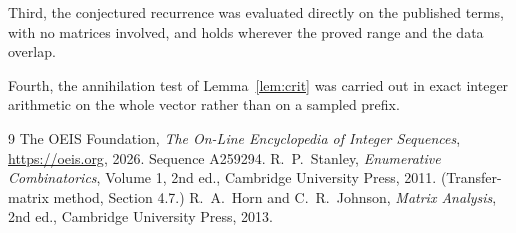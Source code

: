 \documentclass[11pt,a4paper]{article}
\theoremstyle{plain}
\theoremstyle{definition}
\begin{document}
Third, the conjectured recurrence was evaluated directly on the published terms, with no
matrices involved, and holds wherever the proved range and the data overlap.

Fourth, the annihilation test of Lemma~\ref{lem:crit} was carried out in exact integer
arithmetic on the whole vector rather than on a sampled prefix.

\begin{thebibliography}{9}
 The OEIS Foundation, \emph{The On-Line Encyclopedia of Integer
Sequences}, \url{https://oeis.org}, 2026. Sequence A259294.
 R.~P.~Stanley, \emph{Enumerative Combinatorics}, Volume 1, 2nd ed.,
Cambridge University Press, 2011. (Transfer-matrix method, Section 4.7.)
 R.~A.~Horn and C.~R.~Johnson, \emph{Matrix Analysis}, 2nd ed., Cambridge
University Press, 2013.
\end{thebibliography}
\end{document}

